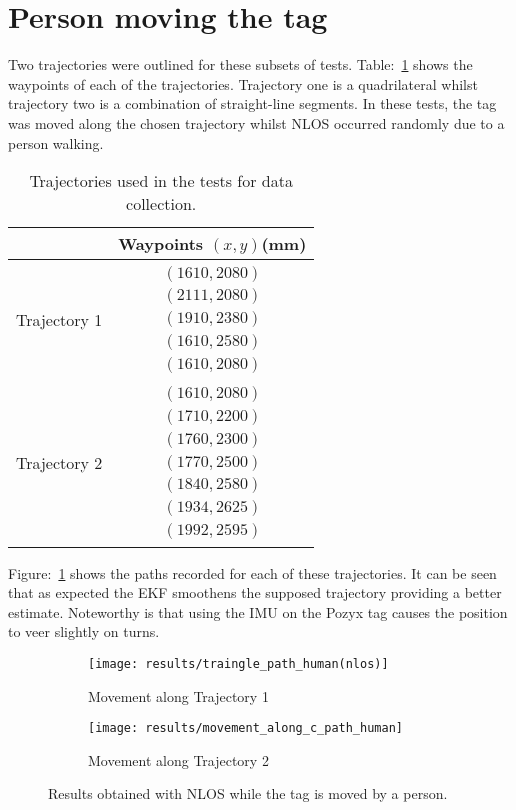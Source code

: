 \section{Person moving the tag}\label{sec:person-moving-the-tag}
Two trajectories were outlined for these subsets of tests.
Table:~\ref{tb:trajs} shows the waypoints of each of the trajectories.
Trajectory one is a quadrilateral whilst trajectory two is a combination of straight-line segments.
In these tests, the tag was moved along the chosen trajectory whilst NLOS occurred randomly due to a person walking.
\begin{table}[ht!]
    \centering
    \begin{tabular}{|c|c|}
        \hline
        & Waypoints $(x,y)$(mm)\\
        \hline
        Trajectory 1 & $\begin{array}{c}
                            (1610, 2080)\\
                            (2111, 2080)\\
                            (1910, 2380)\\
                            (1610, 2580)\\
                            (1610, 2080)
        \end{array}$\\
        \hline
        Trajectory 2 & $\begin{array}{c}
                            (1610, 2080)\\
                            (1710, 2200)\\
                            (1760, 2300)\\
                            (1770, 2500)\\
                            (1840, 2580)\\
                            (1934, 2625)\\
                            (1992, 2595)
        \end{array}$\\
        \hline
    \end{tabular}
    \caption{Trajectories used in the tests for data collection.}
    \label{tb:trajs}
\end{table}
Figure:~\ref{fig:nlos_ppl} shows the paths recorded for each of these trajectories.
It can be seen that as expected the EKF smoothens the supposed trajectory providing a better estimate.
Noteworthy is that using the IMU on the Pozyx tag causes the position to veer slightly on turns.
\begin{figure}[ht!]
    \centering
    \begin{subfigure}{0.7\textwidth}
            \texttt{[image: results/traingle\_path\_human(nlos)]}
            \caption{Movement along Trajectory 1}
    \end{subfigure}
    \begin{subfigure}{0.7\textwidth}
            \texttt{[image: results/movement\_along\_c\_path\_human]}
            \caption{Movement along Trajectory 2}
    \end{subfigure}
    \caption{Results obtained with NLOS while the tag is moved by a person.}
    \label{fig:nlos_ppl}
\end{figure}
\newpage
